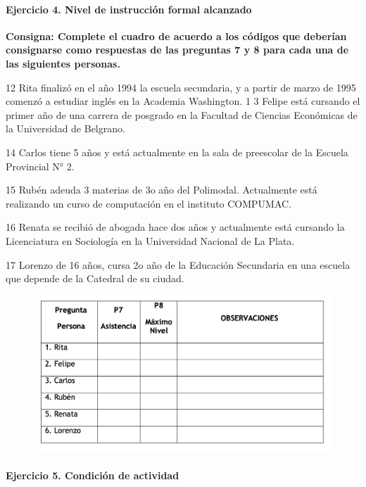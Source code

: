 \documentclass[
  openany]{book}
\begin{document}
\hypertarget{ejercicio-4.-nivel-de-instrucciuxf3n-formal-alcanzado}{%
\paragraph{Ejercicio 4. Nivel de instrucción formal alcanzado}\label{ejercicio-4.-nivel-de-instrucciuxf3n-formal-alcanzado}}

\textbf{Consigna: Complete el cuadro de acuerdo a los códigos que deberían consignarse como respuestas de las preguntas 7 y 8 para cada una de las siguientes personas.}

12 Rita finalizó en el año 1994 la escuela secundaria, y a partir de marzo de 1995 comenzó a estudiar inglés en la Academia Washington. 1 3 Felipe está cursando el primer año de una carrera de posgrado en la Facultad de Ciencias Económicas de la Universidad de Belgrano.

14 Carlos tiene 5 años y está actualmente en la sala de preescolar de la Escuela Provincial N° 2.

15 Rubén adeuda 3 materias de 3o año del Polimodal. Actualmente está realizando un curso de computación en el instituto COMPUMAC.

16 Renata se recibió de abogada hace dos años y actualmente está cursando la Licenciatura en Sociología en la Universidad Nacional de La Plata.

17 Lorenzo de 16 años, cursa 2o año de la Educación Secundaria en una escuela que depende de la Catedral de su ciudad.

\begin{figure}

{\centering \includegraphics[width=1\linewidth]{imagenes/figura6-147} 

}

\end{figure}

\hypertarget{ejercicio-5.-condiciuxf3n-de-actividad}{%
\paragraph{Ejercicio 5. Condición de actividad}\label{ejercicio-5.-condiciuxf3n-de-actividad}}
\end{document}
